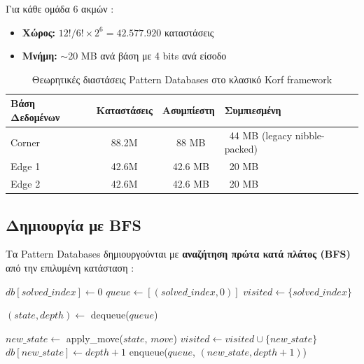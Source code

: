 Για κάθε ομάδα 6 ακμών \cite{korf1997finding}:
\begin{itemize}
    \item \textbf{Χώρος:} $12!/6! \times 2^6 = 42.577.920$ καταστάσεις
    \item \textbf{Μνήμη:} $\sim$20 MB ανά βάση με 4 bits ανά είσοδο
\end{itemize}

\begin{table}[htbp]
\centering
\footnotesize
\caption{Θεωρητικές διαστάσεις Pattern Databases στο κλασικό Korf framework}
\label{tab:korf_pdb_sizes}
\begin{tabularx}{\textwidth}{|>{\RaggedRight\arraybackslash}X|c|c|>{\RaggedRight\arraybackslash}X|}
\hline
\textbf{Βάση Δεδομένων} & \textbf{Καταστάσεις} & \textbf{Ασυμπίεστη} & \textbf{Συμπιεσμένη} \\
\hline
Corner & 88.2M & ~88 MB & ~44 MB (legacy nibble-packed) \\
Edge 1 & 42.6M & ~42.6 MB & ~20 MB \\
Edge 2 & 42.6M & ~42.6 MB & ~20 MB \\
\hline
\end{tabularx}
\end{table}

\subsection{Δημιουργία με BFS}

Τα Pattern Databases δημιουργούνται με \textbf{αναζήτηση πρώτα κατά πλάτος (BFS)} από την επιλυμένη κατάσταση \cite{culberson1998pattern,korf1997finding}:

\begin{algorithm}[H]
\caption{Δημιουργία Pattern Database}
\begin{algorithmic}[1]
    \State $db[solved\_index] \gets 0$
    \State $queue \gets [(solved\_index, 0)]$
    \State $visited \gets \{solved\_index\}$

        \State $(state, depth) \gets$ dequeue($queue$)

            \State $new\_state \gets$ apply\_move($state$, $move$)
                \State $visited \gets visited \cup \{new\_state\}$
                \State $db[new\_state] \gets depth + 1$
                \State enqueue($queue$, $(new\_state, depth + 1)$)
            \EndIf
        \EndFor
    \EndWhile
\EndProcedure
\end{algorithmic}
\end{algorithm}


